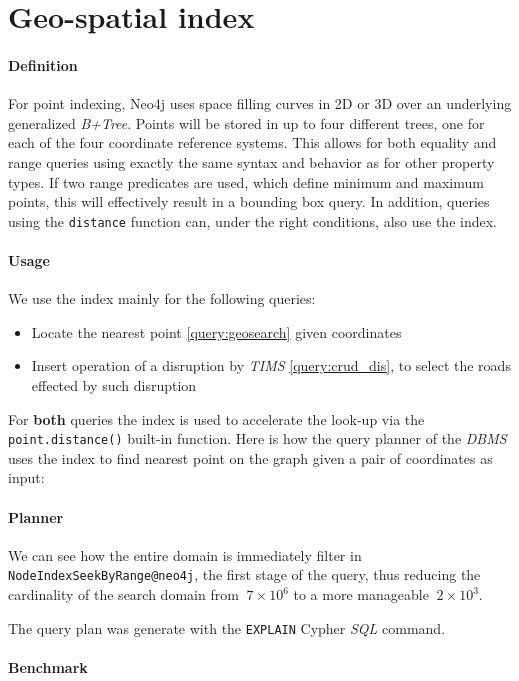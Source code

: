 \section{Geo-spatial index}

\paragraph{Definition}
For point indexing, Neo4j uses space filling curves in 2D or 3D over an 
underlying generalized \textit{B+Tree}. Points will be stored in up to four 
different trees, one for each of the four coordinate reference systems. This 
allows for both equality and range queries using exactly the same syntax and 
behavior as for other property types. If two range predicates are used, which 
define minimum and maximum points, this will effectively result in a bounding 
box query. In addition, queries using the \texttt{distance} function can, under 
the right conditions, also use the index.

\paragraph{Usage}
We use the index mainly for the following queries:

\begin{itemize}
	\item Locate the nearest point \ref{query:geosearch} given coordinates
	
	\item Insert operation of a disruption by \textit{TIMS} \ref{query:crud_dis}, to select the roads effected by such disruption
\end{itemize}

For \textbf{both} queries the index is used to accelerate the look-up via the 
\texttt{point.distance()} built-in function. Here is how the query planner of 
the \textit{DBMS} uses the index to find nearest point on the graph given a 
pair of coordinates as input:

\paragraph{Planner}
We can see how the entire domain is immediately filter in 
\texttt{NodeIndexSeekByRange@neo4j}, the first stage of the query, thus 
reducing the cardinality of the 
search domain from $~7 \times 10^6$ to a more manageable $~ 2 \times 10^3$.

The query plan was generate with the \texttt{EXPLAIN} Cypher \textit{SQL 
}command.




\paragraph{Benchmark}





